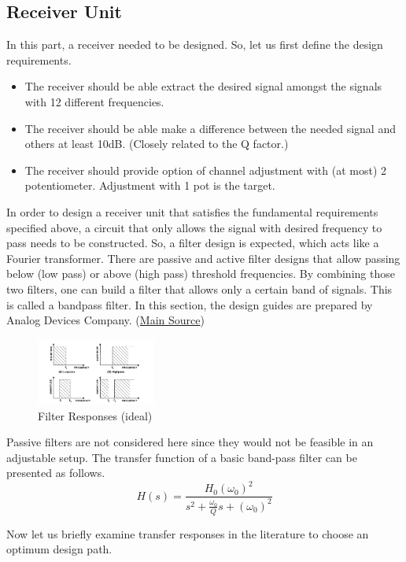 \documentclass[letterpaper,12pt]{article}
\begin{document}
\subsection{Receiver Unit}
In this part, a receiver needed to be designed. So, let us first define the design requirements.
\begin{itemize}
    \item The receiver should be able extract the desired signal amongst the signals with 12 different frequencies.
    \item The receiver should be able make a difference between the needed signal and others at least 10dB. (Closely related to the Q factor.)
    \item The receiver should provide option of channel adjustment with (at most) 2 potentiometer. Adjustment with 1 pot is the target. 
\end{itemize}
In order to design a receiver unit that satisfies the fundamental requirements specified above, a circuit that only allows the signal with desired frequency to pass needs to be constructed. So, a filter design is expected, which acts like a Fourier transformer. There are passive and active filter designs that allow passing below (low pass) or above (high pass) threshold frequencies. By combining those two filters, one can build a filter that allows only a certain band of signals. This is called a bandpass filter. In this section, the design guides are prepared by Analog Devices Company. (\href{https://www.analog.com/media/en/training-seminars/design-handbooks/basic-linear-design/chapter8.pdf}{Main Source})
\begin{figure}[H]
    \centering
    \includegraphics[width = 0.35\textwidth]{bandpass.png}
    \caption{Filter Responses (ideal)}
\end{figure} 
Passive filters are not considered here since they would not be feasible in an adjustable setup. The transfer function of a basic band-pass filter can be presented as follows. 
\[
H(s) = \frac{H_0 (\omega_0)^2}{s^2 + \frac{\omega_0}{Q} s  + (\omega_0)^2}    
\]

Now let us briefly examine transfer responses in the literature to choose an optimum design path.
\vspace{-4mm}
\end{document}
